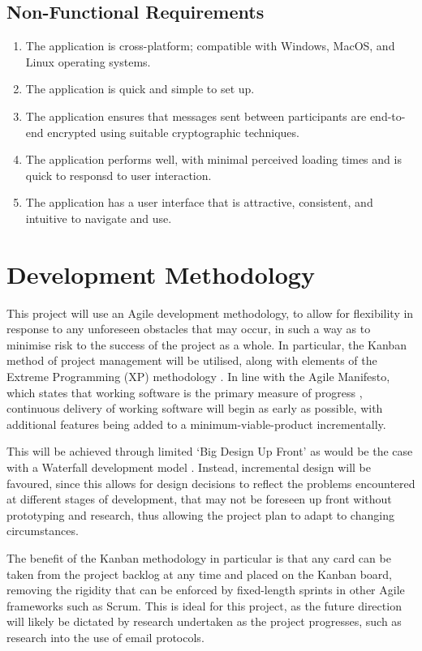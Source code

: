 \subsection{Non-Functional Requirements}
\begin{enumerate}
  \item The application is cross-platform; compatible with Windows, MacOS, and Linux operating systems.
  \item The application is quick and simple to set up.
  \item The application ensures that messages sent between participants are end-to-end encrypted using suitable cryptographic techniques.
  \item The application performs well, with minimal perceived loading times and is quick to responsd to user interaction.
  \item The application has a user interface that is attractive, consistent, and intuitive to navigate and use.
\end{enumerate}

\section{Development Methodology}\label{sec:development-methodology}

This project will use an Agile \cite{fowler2001agile} development methodology, to allow for flexibility in response to any unforeseen obstacles that may occur, in such a way as to minimise risk to the success of the project as a whole. In particular, the Kanban \cite{anderson2010kanban} method of project management will be utilised, along with elements of the Extreme Programming (XP) methodology \cite{beck2000extreme}. In line with the Agile Manifesto, which states that working software is the primary measure of progress \cite{fowler2001agile}, continuous delivery of working software will begin as early as possible, with additional features being added to a minimum-viable-product incrementally.

This will be achieved through limited `Big Design Up Front' as would be the case with a Waterfall development model \cite{balaji2012waterfall}. Instead, incremental design will be favoured, since this allows for design decisions to reflect the problems encountered at different stages of development, that may not be foreseen up front without prototyping and research, thus allowing the project plan to adapt to changing circumstances.

The benefit of the Kanban methodology in particular is that any card can be taken from the project backlog at any time and placed on the Kanban board, removing the rigidity that can be enforced by fixed-length sprints in other Agile frameworks such as Scrum. This is ideal for this project, as the future direction will likely be dictated by research undertaken as the project progresses, such as research into the use of email protocols.

